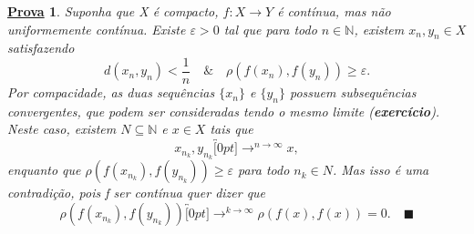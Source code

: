 \documentclass{article}
\newtheorem*{proof*}{\underline{Prova}}
\renewcommand\qedsymbol{$\blacksquare$}
\begin{document}
\begin{proof*}
  Suponha que X é compacto, \(f:X\rightarrow Y\) é contínua, mas não uniformemente contínua. Existe \(\varepsilon >0\) tal que
para todo \(n\in \mathbb{N}\), existem \(x_{n}, y_{n}\in X\) satisfazendo 
  \[
    d(x_{n},y_{n}) < \frac{1}{n}\quad\&\quad \rho (f(x_{n}), f(y_{n}))\geq \varepsilon .
  \]
  Por compacidade, as duas sequências \(\{x_{n}\}\) e \(\{y_{n}\}\) possuem subsequências convergentes, que podem
ser consideradas tendo o mesmo limite (\textbf{exercício}). Neste caso, existem \(N\subseteq \mathbb{N}\) e \(x\in X\) tais que 
  \[
    x_{n_{k}}, y_{n_{k}}\overbracket[0pt]{\longrightarrow}^{n\to \infty}x,
  \]
  enquanto que \(\rho (f(x_{n_{k}}), f(y_{n_{k}}))\geq \varepsilon \) para todo \(n_{k}\in N\).
  Mas isso é uma contradição, pois f ser contínua quer dizer que 
    \[
      \rho (f(x_{n_{k}}), f(y_{n_{k}}))\overbracket[0pt]{\longrightarrow}^{k\to \infty}\rho(f(x), f(x)) = 0.\quad \text{\qedsymbol}
    \]
\end{proof*}
\newpage
\end{document}
